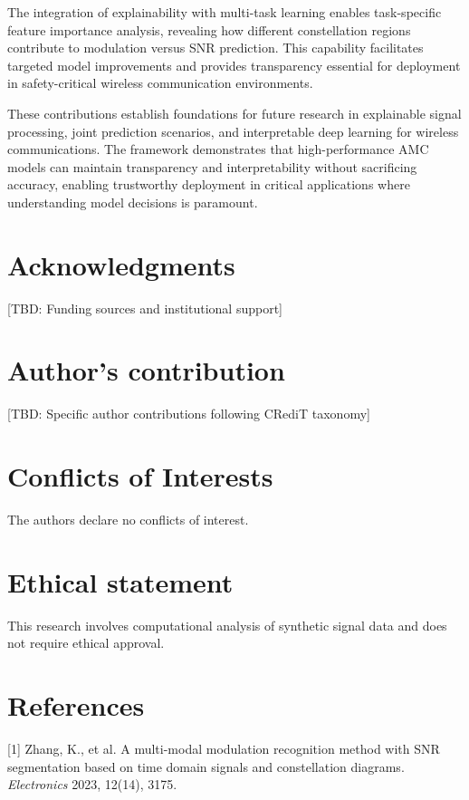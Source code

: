 \documentclass{ELSP}
\begin{document}
{{The integration of explainability with multi-task learning enables task-specific feature importance analysis, revealing how different constellation regions contribute to modulation versus SNR prediction. This capability facilitates targeted model improvements and provides transparency essential for deployment in safety-critical wireless communication environments.

These contributions establish foundations for future research in explainable signal processing, joint prediction scenarios, and interpretable deep learning for wireless communications. The framework demonstrates that high-performance AMC models can maintain transparency and interpretability without sacrificing accuracy, enabling trustworthy deployment in critical applications where understanding model decisions is paramount.

\section*{Acknowledgments}
 
[TBD: Funding sources and institutional support]

\section*{Author's contribution}

[TBD: Specific author contributions following CRediT taxonomy]

\section*{Conflicts of Interests}

The authors declare no conflicts of interest.

\section*{Ethical statement}

This research involves computational analysis of synthetic signal data and does not require ethical approval.

\section*{References}

\setlength{\parindent}{0em}

[1] Zhang, K., et al. A multi-modal modulation recognition method with SNR segmentation based on time domain signals and constellation diagrams. \textit{Electronics} 2023, 12(14), 3175.

}}
\end{document}
